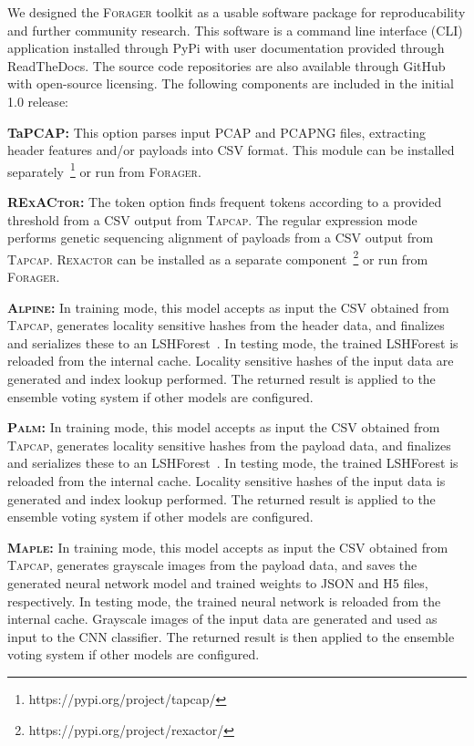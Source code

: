 We designed the \textsc{Forager} toolkit as a usable software package for reproducability and further community research. This software is a command line interface (CLI) application installed through PyPi with user documentation provided through ReadTheDocs. The source code repositories are also available through GitHub with open-source licensing. The following components are included in the initial 1.0 release:

\medskip

\textbf{TaPCAP: } This option parses input PCAP and PCAPNG files, extracting header features and/or payloads into CSV format. This module can be installed separately~\footnote{https://pypi.org/project/tapcap/} or run from \textsc{Forager}.

\textbf{\textsc{RExACtor}: } The token option finds frequent tokens according to a provided threshold from a CSV output from \textsc{Tapcap}. The regular expression mode performs genetic sequencing alignment of payloads from a CSV output from \textsc{Tapcap}. \textsc{Rexactor} can be installed as a separate component~\footnote{https://pypi.org/project/rexactor/} or run from \textsc{Forager}.

\textbf{\textsc{Alpine}: } In training mode, this model accepts as input the CSV obtained from \textsc{Tapcap}, generates locality sensitive hashes from the header data, and finalizes and serializes these to an LSHForest~\cite{lshforest}. In testing mode, the trained LSHForest is reloaded from the internal cache. Locality sensitive hashes of the input data are generated and index lookup performed. The returned result is applied to the ensemble voting system if other models are configured.

\textbf{\textsc{Palm}: } In training mode, this model accepts as input the CSV obtained from \textsc{Tapcap}, generates locality sensitive hashes from the payload data, and finalizes and serializes these to an LSHForest~\cite{lshforest}. In testing mode, the trained LSHForest is reloaded from the internal cache. Locality sensitive hashes of the input data is generated and index lookup performed. The returned result is applied to the ensemble voting system if other models are configured.

\textbf{\textsc{Maple}: } In training mode, this model accepts as input the CSV obtained from \textsc{Tapcap}, generates grayscale images from the payload data, and saves the generated neural network model and trained weights to JSON and H5 files, respectively. In testing mode, the trained neural network is reloaded from the internal cache. Grayscale images of the input data are generated and used as input to the CNN classifier. The returned result is then applied to the ensemble voting system if other models are configured.

